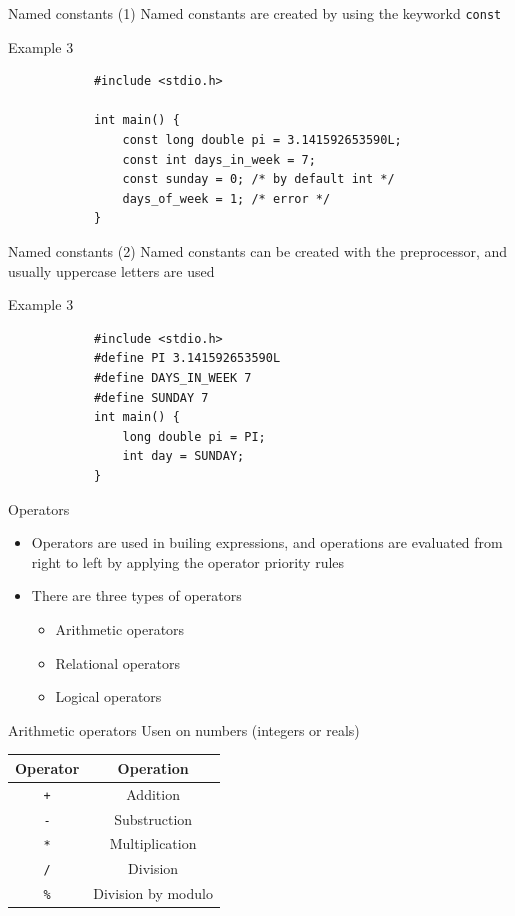 \begin{frame}[fragile]{Named constants (1)}
\Large{Named constants are created by using the keyworkd \texttt{const}}
\begin{exampleblock}{Example 3}
        \begin{lstlisting}
            #include <stdio.h>

            int main() {
                const long double pi = 3.141592653590L;
                const int days_in_week = 7;
                const sunday = 0; /* by default int */
                days_of_week = 1; /* error */
            }
        \end{lstlisting}
    \end{exampleblock}
\end{frame}

\begin{frame}[fragile]{Named constants (2)}
Named constants can be created with the preprocessor, and usually
uppercase letters are used
    \begin{exampleblock}{Example 3}
        \begin{lstlisting}
            #include <stdio.h>
            #define PI 3.141592653590L
            #define DAYS_IN_WEEK 7
            #define SUNDAY 7        
            int main() {
                long double pi = PI;
                int day = SUNDAY;
            }
        \end{lstlisting}
    \end{exampleblock}
\end{frame}

\begin{frame}{Operators}
\begin{itemize}
\item Operators are used in builing expressions, and operations are
evaluated from right to left by applying the operator priority rules
\item There are three types of operators
\begin{itemize}
\item Arithmetic operators
\item Relational operators
\item Logical operators
\end{itemize}
\end{itemize}
\end{frame}

\begin{frame}{Arithmetic operators}
Usen on numbers (integers or reals)
\linebreak
\begin{center}
\begin{tabular}{c|c}
\textbf{Operator} & \textbf{Operation}\\
\hline
\texttt{+} & Addition \\
\texttt{-} & Substruction \\
\texttt{*} & Multiplication \\
\texttt{/} & Division \\
\texttt{\%} & Division by modulo
\end{tabular}
\end{center}
\end{frame}


